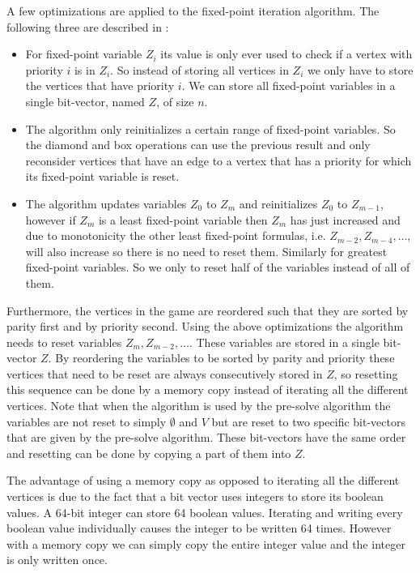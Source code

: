A few optimizations are applied to the fixed-point iteration algorithm. The following three are described in \cite{FPITE}:
\begin{itemize}
	\item For fixed-point variable $Z_i$ its value is only ever used to check if a vertex with priority $i$ is in $Z_i$. So instead of storing all vertices in $Z_i$ we only have to store the vertices that have priority $i$. We can store all fixed-point variables in a single bit-vector, named $Z$, of size $n$.
	\item The algorithm only reinitializes a certain range of fixed-point variables. So the diamond and box operations can use the previous result and only reconsider vertices that have an edge to a vertex that has a priority for which its fixed-point variable is reset.
	\item The algorithm updates variables $Z_0$ to $Z_m$ and reinitializes $Z_0$ to $Z_{m-1}$, however if $Z_m$ is a least fixed-point variable then $Z_m$ has just increased and due to monotonicity the other least fixed-point formulas, i.e. $Z_{m-2},Z_{m-4},\dots$, will also increase so there is no need to reset them. Similarly for greatest fixed-point variables. So we only to reset half of the variables instead of all of them.
\end{itemize}
Furthermore, the vertices in the game are reordered such that they are sorted by parity first and by priority second. Using the above optimizations the algorithm needs to reset variables $Z_{m}, Z_{m-2},\dots$. These variables are stored in a single bit-vector $Z$. By reordering the variables to be sorted by parity and priority these vertices that need to be reset are always consecutively stored in $Z$, so resetting this sequence can be done by a memory copy instead of iterating all the different vertices. Note that when the algorithm is used by the pre-solve algorithm the variables are not reset to simply $\emptyset$ and $V$ but are reset to two specific bit-vectors that are given by the pre-solve algorithm. These bit-vectors have the same order and resetting can be done by copying a part of them into $Z$.

The advantage of using a memory copy as opposed to iterating all the different vertices is due to the fact that a bit vector uses integers to store its boolean values. A 64-bit integer can store 64 boolean values. Iterating and writing every boolean value individually causes the integer to be written 64 times. However with a memory copy we can simply copy the entire integer value and the integer is only written once.

